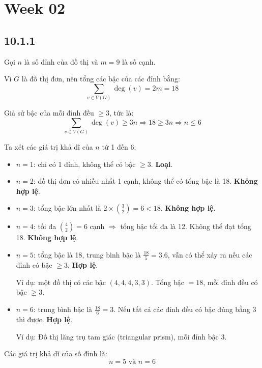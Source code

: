 \documentclass{article}
\begin{document}
	
	\section*{Week 02}
	\subsection*{10.1.1}
	Gọi \( n \) là số đỉnh của đồ thị và \( m = 9 \) là số cạnh.
	
	Vì \( G \) là đồ thị đơn, nên tổng các bậc của các đỉnh bằng:
	\[
	\sum_{v \in V(G)} \deg(v) = 2m = 18
	\]
	
	Giả sử bậc của mỗi đỉnh đều \( \geq 3 \), tức là:
	\[
	\sum_{v \in V(G)} \deg(v) \geq 3n \Rightarrow 18 \geq 3n \Rightarrow n \leq 6
	\]
	
	Ta xét các giá trị khả dĩ của \( n \) từ 1 đến 6:
	
	\begin{itemize}
		\item \( n = 1 \): chỉ có 1 đỉnh, không thể có bậc \( \geq 3 \). \textbf{Loại}.
		\item \( n = 2 \): đồ thị đơn có nhiều nhất 1 cạnh, không thể có tổng bậc là 18. \textbf{Không hợp lệ}.
		\item \( n = 3 \): tổng bậc lớn nhất là \( 2 \times \binom{3}{2} = 6 < 18 \). \textbf{Không hợp lệ}.
		\item \( n = 4 \): tối đa \( \binom{4}{2} = 6 \) cạnh \(\Rightarrow\) tổng bậc tối đa là 12. Không thể đạt tổng 18. \textbf{Không hợp lệ}.
		\item \( n = 5 \): tổng bậc là 18, trung bình bậc là \( \frac{18}{5} = 3.6 \), vẫn có thể xảy ra nếu các đỉnh có bậc \( \geq 3 \). \textbf{Hợp lệ}.
		
		Ví dụ: một đồ thị có các bậc \( (4,4,4,3,3) \). Tổng bậc \( = 18 \), mỗi đỉnh đều có bậc \( \geq 3 \).
		
		\item \( n = 6 \): trung bình bậc là \( \frac{18}{6} = 3 \). Nếu tất cả các đỉnh đều có bậc đúng bằng 3 thì được. \textbf{Hợp lệ}.
		
		Ví dụ: Đồ thị lăng trụ tam giác (triangular prism), mỗi đỉnh bậc 3.
	\end{itemize}
	
	Các giá trị khả dĩ của số đỉnh là:
	\[
	\boxed{n = 5 \text{ và } n = 6}
	\]
	
\end{document}
